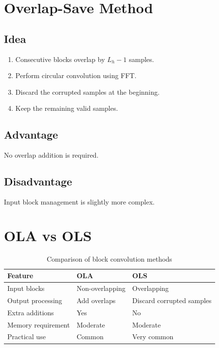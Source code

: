 \section{Overlap-Save Method}


\subsection{Idea}

\begin{enumerate}
\item Consecutive blocks overlap by \(L_h-1\) samples.
\item Perform circular convolution using FFT.
\item Discard the corrupted samples at the beginning.
\item Keep the remaining valid samples.
\end{enumerate}


\subsection{Advantage}

No overlap addition is required.


\subsection{Disadvantage}

Input block management is slightly more complex.


\section{OLA vs OLS}

\begin{table}[H]
\centering
\caption{Comparison of block convolution methods}
\begin{tabular}{|p{4cm}|p{4cm}|p{4cm}|}
\hline
\textbf{Feature} & \textbf{OLA} & \textbf{OLS}\\
\hline
Input blocks & Non-overlapping & Overlapping\\
\hline
Output processing & Add overlaps & Discard corrupted samples\\
\hline
Extra additions & Yes & No\\
\hline
Memory requirement & Moderate & Moderate\\
\hline
Practical use & Common & Very common\\
\hline
\end{tabular}
\end{table}

